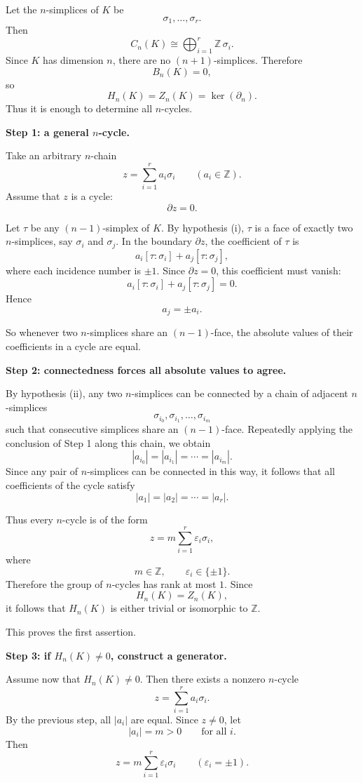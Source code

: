 \documentclass[12pt,a4paper]{article}
\theoremstyle{notespace}
\begin{document}
Let the \(n\)-simplices of \(K\) be
\[
\sigma_1,\dots,\sigma_r.
\]
Then
\[
C_n(K)\cong \bigoplus_{i=1}^r \mathbb Z\,\sigma_i.
\]
Since \(K\) has dimension \(n\), there are no \((n+1)\)-simplices. Therefore
\[
B_n(K)=0,
\]
so
\[
H_n(K)=Z_n(K)=\ker(\partial_n).
\]
Thus it is enough to determine all \(n\)-cycles.

\medskip

\textbf{Step 1: a general \(n\)-cycle.}

Take an arbitrary \(n\)-chain
\[
z=\sum_{i=1}^r a_i\sigma_i
\qquad (a_i\in \mathbb Z).
\]
Assume that \(z\) is a cycle:
\[
\partial z=0.
\]

Let \(\tau\) be any \((n-1)\)-simplex of \(K\). By hypothesis (i), \(\tau\) is a face of exactly two \(n\)-simplices, say \(\sigma_i\) and \(\sigma_j\). In the boundary \(\partial z\), the coefficient of \(\tau\) is
\[
a_i[\tau:\sigma_i] + a_j[\tau:\sigma_j],
\]
where each incidence number is \(\pm 1\). Since \(\partial z=0\), this coefficient must vanish:
\[
a_i[\tau:\sigma_i] + a_j[\tau:\sigma_j]=0.
\]
Hence
\[
a_j=\pm a_i.
\]

So whenever two \(n\)-simplices share an \((n-1)\)-face, the absolute values of their coefficients in a cycle are equal.

\medskip

\textbf{Step 2: connectedness forces all absolute values to agree.}

By hypothesis (ii), any two \(n\)-simplices can be connected by a chain of adjacent \(n\)-simplices
\[
\sigma_{i_0},\sigma_{i_1},\dots,\sigma_{i_m}
\]
such that consecutive simplices share an \((n-1)\)-face. Repeatedly applying the conclusion of Step 1 along this chain, we obtain
\[
|a_{i_0}|=|a_{i_1}|=\cdots=|a_{i_m}|.
\]
Since any pair of \(n\)-simplices can be connected in this way, it follows that all coefficients of the cycle satisfy
\[
|a_1|=|a_2|=\cdots=|a_r|.
\]

Thus every \(n\)-cycle is of the form
\[
z=m\sum_{i=1}^r \varepsilon_i \sigma_i,
\]
where
\[
m\in \mathbb Z,
\qquad
\varepsilon_i\in \{\pm 1\}.
\]
Therefore the group of \(n\)-cycles has rank at most \(1\). Since
\[
H_n(K)=Z_n(K),
\]
it follows that \(H_n(K)\) is either trivial or isomorphic to \(\mathbb Z\).

This proves the first assertion.

\medskip

\textbf{Step 3: if \(H_n(K)\neq 0\), construct a generator.}

Assume now that \(H_n(K)\neq 0\). Then there exists a nonzero \(n\)-cycle
\[
z=\sum_{i=1}^r a_i\sigma_i.
\]
By the previous step, all \(|a_i|\) are equal. Since \(z\neq 0\), let
\[
|a_i|=m>0
\qquad\text{for all } i.
\]
Then
\[
z=m\sum_{i=1}^r \varepsilon_i\sigma_i
\qquad (\varepsilon_i=\pm 1).
\]
\end{document}
